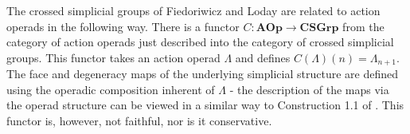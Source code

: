 \documentclass{amsbook} %
\numberwithin{section}{chapter}
\begin{document}
\begin{rem}
The crossed simplicial groups of Fiedoriwicz and Loday \cite{FL91} are related to action operads in the following way. There is a functor $C \colon \mathbf{AOp} \rightarrow \mathbf{CSGrp}$ from the category of action operads just described into the category of crossed simplicial groups. This functor takes an action operad $\Lambda$ and defines $C(\Lambda)(n) = \Lambda_{n+1}$. The face and degeneracy maps of the underlying simplicial structure are defined using the operadic composition inherent of $\Lambda$ - the description of the maps via the operad structure can be viewed in a similar way to Construction 1.1 of \cite{Kra96}. This functor is, however, not faithful, nor is it conservative.
\end{rem}
\end{document}
